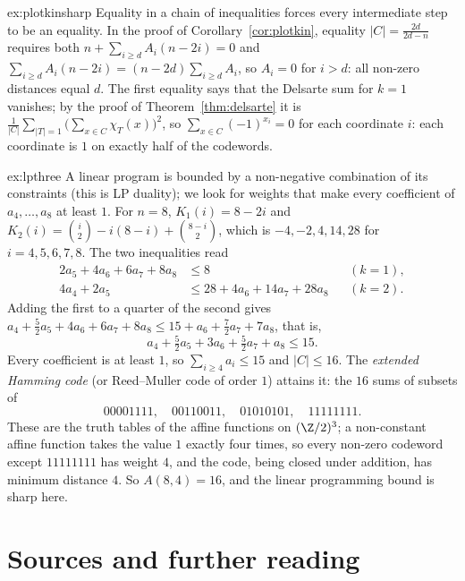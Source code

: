 \begin{solution}{ex:plotkinsharp}
\idea Equality in a chain of inequalities forces every intermediate step to be an equality.
\writeup In the proof of Corollary~\ref{cor:plotkin}, equality $|C|=\frac{2d}{2d-n}$ requires both $n+\sum_{i\ge d}A_i(n-2i)=0$ and
$\sum_{i\ge d}A_i(n-2i)=(n-2d)\sum_{i\ge d}A_i$, so $A_i=0$ for $i>d$: all non-zero distances equal $d$. The first equality says that the
Delsarte sum for $k=1$ vanishes; by the proof of Theorem~\ref{thm:delsarte} it is $\frac1{|C|}\sum_{|T|=1}\bigl(\sum_{x\in C}\chi_T(x)
\bigr)^2$, so $\sum_{x\in C}(-1)^{x_i}=0$ for each coordinate $i$: each coordinate is $1$ on exactly half of the codewords.
\end{solution}

\begin{solution}{ex:lpthree}
\idea A linear program is bounded by a non-negative combination of its constraints (this is LP duality); we look for weights that
make every coefficient of $a_4,\dots,a_8$ at least $1$.
\writeup For $n=8$, $K_1(i)=8-2i$ and $K_2(i)=\binom i2-i(8-i)+\binom{8-i}2$, which is $-4,-2,4,14,28$ for $i=4,5,6,7,8$. The two
inequalities read
\[
\begin{aligned}
2a_5+4a_6+6a_7+8a_8&\le8&&(k=1),\\
4a_4+2a_5&\le28+4a_6+14a_7+28a_8&&(k=2).
\end{aligned}
\]
Adding the first to a quarter of the second gives $a_4+\frac52a_5+4a_6+6a_7+8a_8\le15+a_6+\frac72a_7+7a_8$, that is,
\[
a_4+\tfrac52a_5+3a_6+\tfrac52a_7+a_8\le15.
\]
Every coefficient is at least $1$, so $\sum_{i\ge4}a_i\le15$ and $|C|\le16$. The \emph{extended Hamming code} (or Reed--Muller code
of order $1$) attains it: the $16$ sums of subsets of
\[
00001111,\quad 00110011,\quad 01010101,\quad 11111111.
\]
These are the truth tables of the affine functions on $(\Z/2)^3$; a non-constant affine function takes the value $1$ exactly four
times, so every non-zero codeword except $11111111$ has weight $4$, and the code, being closed under addition, has minimum distance
$4$. So $A(8,4)=16$, and the linear programming bound is sharp here.
\end{solution}

\section*{Sources and further reading}

